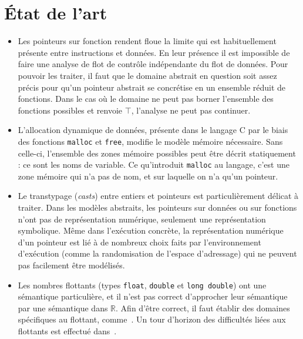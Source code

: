 \section{État de l'art}%

\begin{itemize}
\item
Les pointeurs sur fonction rendent floue la limite qui est habituellement
présente entre instructions et données. En leur présence il est impossible de
faire une analyse de flot de contrôle indépendante du flot de données. Pour
pouvoir les traiter, il faut que le domaine abstrait en question soit assez
précis pour qu'un pointeur abstrait se concrétise en un ensemble réduit de
fonctions. Dans le cas où le domaine ne peut pas borner l'ensemble des fonctions
possibles et renvoie $\top$, l'analyse ne peut pas continuer.

\item
L'allocation dynamique de données, présente dans le langage C par le biais des
fonctions \texttt{malloc} et \texttt{free}, modifie le modèle mémoire
nécessaire. Sans celle-ci, l'ensemble des zones mémoire possibles peut être
décrit statiquement : ce sont les noms de variable. Ce qu'introduit
\texttt{malloc} au langage, c'est une zone mémoire qui n'a pas de nom, et sur
laquelle on n'a qu'un pointeur.


\item
Le transtypage (\emph{casts}) entre entiers et pointeurs est particulièrement
délicat à traiter. Dans les modèles abstraits, les pointeurs sur données ou sur
fonctions n'ont pas de représentation numérique, seulement une représentation
symbolique. Même dans l'exécution concrète, la représentation numérique d'un
pointeur est lié à de nombreux choix faits par l'environnement d'exécution
(comme la randomisation de l'espace d'adressage) qui ne peuvent pas facilement
être modélisés.

\item
Les nombres flottants (types \texttt{float}, \texttt{double} et \texttt{long
double}) ont une sémantique particulière, et il n'est pas correct d'approcher
leur sémantique par une sémantique dans $ℝ$. Afin d'être correct, il faut
établir des domaines spécifiques au flottant, comme~\cite{floatpoly}. Un tour
d'horizon des difficultés liées aux flottants est effectué
dans~\cite{floatpitfalls}.

\end{itemize}


